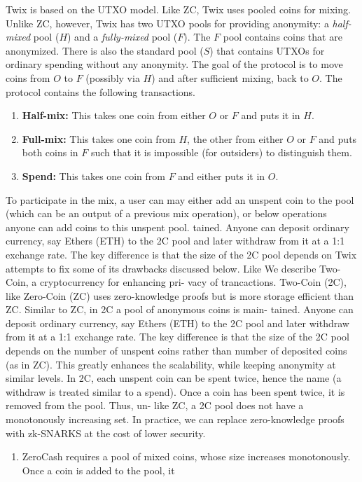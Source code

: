 \documentclass[11pt]{article}
\newcommand{\mixname}{Twix\xspace}
\begin{document}
\mixname is based on the UTXO model. Like ZC, \mixname uses pooled coins for mixing. Unlike ZC, however, \mixname has two UTXO pools for providing anonymity: a {\em half-mixed} pool ($H$) and a {\em fully-mixed} pool ($F$). The $F$ pool contains coins that are anonymized. There is also the standard pool ($S$) that contains UTXOs for ordinary spending without any anonymity. The goal of the protocol is to move coins from $O$ to $F$ (possibly via $H$) and after sufficient mixing, back to $O$. The protocol contains the following transactions. 
\begin{enumerate}
	\item \textbf{Half-mix:} This takes one coin from either $O$ or $F$ and puts it in $H$.
	\item \textbf{Full-mix:} This takes one coin from $H$, the other from either $O$ or $F$ and puts both coins in $F$ such that it is impossible (for outsiders) to distinguish them.
	\item \textbf{Spend:} This takes one coin from $F$ and either puts it in $O$.%
		
\end{enumerate}
To participate in the mix, a user can may either add an unspent coin to the pool (which can be an output of a previous mix operation), or below operations anyone can add coins to this unspent pool. 
tained. Anyone can deposit ordinary currency, say Ethers
(ETH) to the 2C pool and later withdraw from it at a 1:1
exchange rate. The key difference is that the size of the 2C
pool depends on
Twix attempts to fix some of its drawbacks discussed below. Like 
We describe Two-Coin, a cryptocurrency for enhancing pri-
vacy of trancactions. Two-Coin (2C), like Zero-Coin (ZC)
uses zero-knowledge proofs but is more storage efficient than
ZC. Similar to ZC, in 2C a pool of anonymous coins is main-
tained. Anyone can deposit ordinary currency, say Ethers
(ETH) to the 2C pool and later withdraw from it at a 1:1
exchange rate. The key difference is that the size of the 2C
pool depends on the number of unspent coins rather than
number of deposited coins (as in ZC). This greatly enhances
the scalability, while keeping anonymity at similar levels. In
2C, each unspent coin can be spent twice, hence the name
(a withdraw is treated similar to a spend). Once a coin has
been spent twice, it is removed from the pool. Thus, un-
like ZC, a 2C pool does not have a monotonously increasing
set. In practice, we can replace zero-knowledge proofs with
zk-SNARKS at the cost of lower security.
\begin{enumerate}
	\item ZeroCash requires a pool of mixed coins, whose size increases monotonously. Once a coin is added to the pool, it  
	
\end{enumerate}
\end{document}
